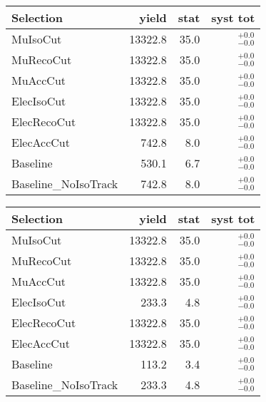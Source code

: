 


\begin{tabular}{l|rrr}
\toprule
              Selection & yield & stat & syst tot   \\ 
\midrule
               MuIsoCut & 13322.8 & 35.0 & ${}^{+0.0}_{-0.0}$ \\
              MuRecoCut & 13322.8 & 35.0 & ${}^{+0.0}_{-0.0}$ \\
               MuAccCut & 13322.8 & 35.0 & ${}^{+0.0}_{-0.0}$ \\
             ElecIsoCut & 13322.8 & 35.0 & ${}^{+0.0}_{-0.0}$ \\
            ElecRecoCut & 13322.8 & 35.0 & ${}^{+0.0}_{-0.0}$ \\
             ElecAccCut & 742.8 & 8.0 & ${}^{+0.0}_{-0.0}$ \\
               Baseline & 530.1 & 6.7 & ${}^{+0.0}_{-0.0}$ \\
   Baseline\_NoIsoTrack & 742.8 & 8.0 & ${}^{+0.0}_{-0.0}$ \\
\bottomrule
\end{tabular}



\begin{tabular}{l|rrr}
\toprule
              Selection & yield & stat & syst tot   \\ 
\midrule
               MuIsoCut & 13322.8 & 35.0 & ${}^{+0.0}_{-0.0}$ \\
              MuRecoCut & 13322.8 & 35.0 & ${}^{+0.0}_{-0.0}$ \\
               MuAccCut & 13322.8 & 35.0 & ${}^{+0.0}_{-0.0}$ \\
             ElecIsoCut & 233.3 & 4.8 & ${}^{+0.0}_{-0.0}$ \\
            ElecRecoCut & 13322.8 & 35.0 & ${}^{+0.0}_{-0.0}$ \\
             ElecAccCut & 13322.8 & 35.0 & ${}^{+0.0}_{-0.0}$ \\
               Baseline & 113.2 & 3.4 & ${}^{+0.0}_{-0.0}$ \\
   Baseline\_NoIsoTrack & 233.3 & 4.8 & ${}^{+0.0}_{-0.0}$ \\
\bottomrule
\end{tabular}



